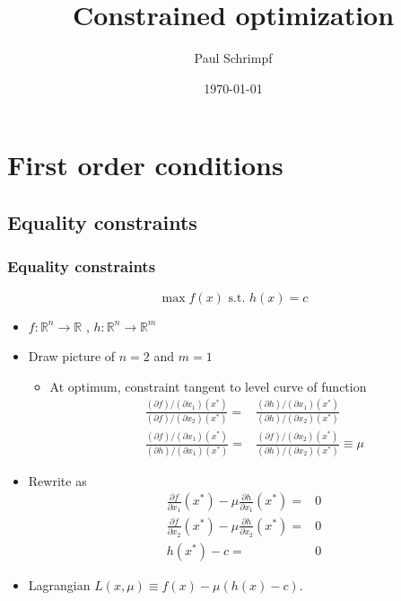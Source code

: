 \documentclass[compress]{beamer}
\title{Constrained optimization}
\author{Paul Schrimpf}
\institute{UBC \\ Economics 526}
\date{\today}
\def\R{\mathbb{R}}
\renewcommand{\to}{{\rightarrow}}
\begin{document}
\frame{\titlepage}

\begin{frame}
  \tableofcontents  
\end{frame}

\section{First order conditions}

\subsection{Equality constraints}
\begin{frame}[shrink]{\frametitle{Equality constraints}}
  \[ \max f(x) \text{ s.t. } h(x) = c \]
  \begin{itemize}
  \item $f: \R^n \to \R$ , $h: \R^n \to \R^m$
  \item Draw picture of $n=2$ and $m=1$
    \begin{itemize}
    \item At optimum, constraint tangent to level curve of function
      \begin{align*}
        \frac{(\partial f)/(\partial x_1) (x^*)}
        {(\partial f)/(\partial x_2)(x^*)} = & \frac{(\partial h)/(\partial x_1)(x^*)}
        {(\partial h)/(\partial x_2)(x^*)} \\
        \frac{(\partial f)/(\partial x_1)(x^*)}
        {(\partial h)/(\partial x_1)(x^*)} = & \frac{(\partial f)/(\partial x_2)(x^*)}
        {(\partial h)/(\partial x_2)(x^*)} \equiv \mu
      \end{align*}
    \end{itemize}
  \item Rewrite as
    \begin{align}
      \frac{\partial f}{\partial x_1} (x^*) - \mu \frac{\partial
        h}{\partial x_1}(x^*) = & 0 \label{ef1} \\
      \frac{\partial f}{\partial x_2} (x^*) - \mu \frac{\partial
        h}{\partial x_2}(x^*) = & 0 \label{ef2} \\
      h(x^*) - c = & 0\label{ebc}
    \end{align}
  \item Lagrangian $ L(x,\mu) \equiv f(x) - \mu(h(x) - c).$
  \end{itemize}
\end{frame}
\end{document}
